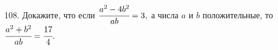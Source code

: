 108. Докажите, что если $\cfrac{a^2-4b^2}{ab}=3,$ а числа $a$ и $b$ положительные, то $\cfrac{a^2+b^2}{ab}=\cfrac{17}{4}.$\\
